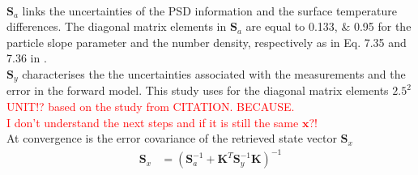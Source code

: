 \\
$\mathbf{S}_a$ links the uncertainties of the PSD information and the surface temperature differences. The diagonal matrix elements in $\mathbf{S}_a$ are equal to \numlist{0.133;0.95} for the particle slope parameter and the number density, respectively as in Eq. 7.35 and 7.36 in \cite{wood_estimation_2011}. \\
$\mathbf{S}_y$ characterises the the uncertainties associated with the measurements and the error in the forward model. This study uses for the diagonal matrix elements $2.5^2$ \textcolor{red}{UNIT!? based on the study from CITATION. BECAUSE.}
\\
%
\textcolor{red}{I don't understand the next steps and if it is still the same $\mathbf{x}$?!} 
\\
At convergence is the error covariance of the retrieved state vector $\mathbf{S}_x$
\begin{align}
	\mathbf{S}_x & = \left( \mathbf{S}_a^{-1} + \mathbf{K}^T \mathbf{S}_y^{-1} \mathbf{K} \right)^{-1}
\end{align}

